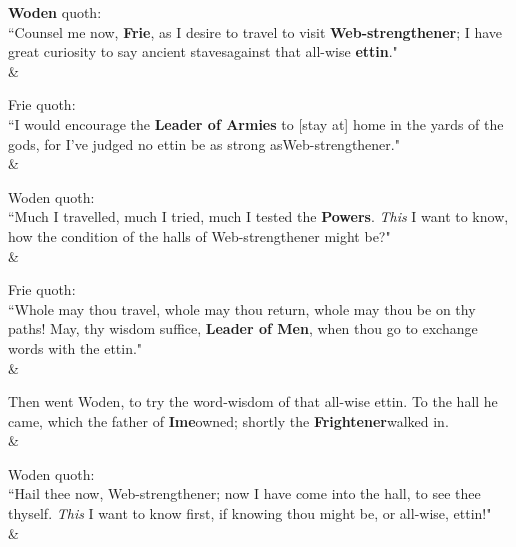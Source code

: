 \chapterStart
\begin{Rightside}
\beginnumbering\numberlinefalse

\begin{astanza}%
\bv{}\textbf{Woden} quoth: \\ “Counsel me now, \textbf{Frie}, as I desire to travel to visit \textbf{Web-strengthener}; I have great curiosity to say ancient staves\footnotemark[1] against that all-wise \textbf{ettin}." \\
\&\end{astanza}%

\begin{astanza}%
\bv Frie quoth: \\ “I would encourage the \textbf{Leader of Armies} to [stay at] home in the yards of the gods, for I've judged no ettin be as strong as\footnotemark[3] Web-strengthener." \\
\&\end{astanza}%

\begin{astanza}%
\bv Woden quoth: \\ “Much I travelled, much I tried, much I tested the \textbf{Powers}\footnotemark[4]. \emph{This} I want to know, how the condition of the halls of Web-strengthener might be?" \\
\&\end{astanza}%

\begin{astanza}%
\bv Frie quoth: \\ “Whole may thou travel, whole may thou return, whole may thou be on thy paths! May, thy wisdom suffice, \textbf{Leader of Men}, when thou go to exchange words with the ettin." \\
\&\end{astanza}%

\begin{astanza}%
\bv Then went Woden, to try the word-wisdom of that all-wise ettin. To the hall he came, which the father of \textbf{Ime}\footnotemark[5] owned; shortly the \textbf{Frightener}\footnotemark[6] walked in. \\
\&\end{astanza}%

\begin{astanza}%
\bv Woden quoth: \\ “Hail thee now, Web-strengthener; now I have come into the hall, to see thee thyself. \emph{This} I want to know first, if knowing thou might be, or all-wise, ettin!" \\
\&\end{astanza}%


\end{Rightside}

